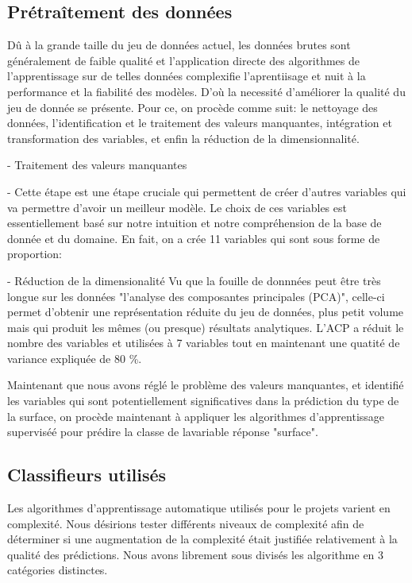 \subsection{Prétraîtement des données}
Dû à la grande taille du jeu de données actuel, les données brutes sont généralement de faible qualité et l'application directe des algorithmes de l'apprentissage sur de  telles données complexifie l'aprentiisage et nuit à la performance et la fiabilité des modèles.
D'où la necessité d'améliorer la qualité du jeu de donnée se présente. Pour ce, on procède comme suit: le nettoyage des données, l'identification et le traitement des valeurs manquantes, intégration et transformation des variables, et enfin la réduction de la dimensionnalité.

- Traitement des valeurs manquantes

-  
Cette étape est une étape cruciale qui permettent de créer d'autres variables qui va permettre d'avoir un meilleur modèle. Le choix de ces variables est essentiellement basé sur notre intuition et notre compréhension de la base de donnée et du domaine.
En fait, on a crée  11 variables qui sont sous forme de proportion:

- Réduction de la dimensionalité
Vu que la fouille de donnnées peut être très longue sur les données "l'analyse des composantes principales (PCA)", celle-ci permet d'obtenir une représentation réduite du jeu de données, plus petit volume mais qui produit les mêmes (ou presque) résultats analytiques. L'ACP a réduit le nombre des variables et  utilisées à 7 variables tout en maintenant une quatité de variance expliquée de 80 \%. 

Maintenant que nous avons réglé le problème des valeurs manquantes, et identifié les variables qui sont potentiellement significatives dans la prédiction du type de la surface, on procède maintenant à appliquer les algorithmes d'apprentissage superviséé pour prédire la classe de lavariable réponse "surface".

\subsection{Classifieurs utilisés}

Les algorithmes d'apprentissage automatique utilisés pour le projets varient en complexité. Nous désirions tester différents niveaux de complexité afin de déterminer si une augmentation de la complexité était justifiée relativement à la qualité des prédictions. Nous avons librement sous divisés les algorithme en 3 catégories distinctes. 

